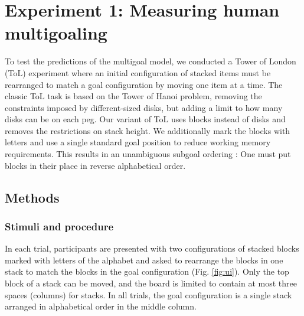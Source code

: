 \documentclass[10pt,letterpaper]{article}
\newcommand{\todo}[1]{\textcolor{red}{\textsc{[TODO: #1]}}}
\begin{document}
\section{Experiment 1: Measuring human multigoaling}

To test the predictions of the multigoal model, we conducted a Tower of London (ToL) experiment \citep{Shallice1982} where an initial configuration of stacked items must be rearranged to match a goal configuration by moving one item at a time. The classic ToL task is based on the Tower of Hanoi problem, removing the constraints imposed by different-sized disks, but adding a limit to how many disks can be on each peg. Our variant of ToL uses blocks instead of disks and removes the restrictions on stack height. We additionally mark the blocks with letters and use a single standard goal position to reduce working memory requirements. This results in an unambiguous subgoal ordering \citep{Kaller2011}: One must put blocks in their place in reverse alphabetical order.





\subsection{Methods}
\subsubsection{Stimuli and procedure}

In each trial, participants are presented with two configurations of stacked blocks marked with letters of the alphabet and asked to rearrange the blocks in one stack to match the blocks in the goal configuration (Fig. \ref{fig:ui}). Only the top block of a stack can be moved, and the board is limited to contain at most three spaces (columns) for stacks. In all trials, the goal configuration is a single stack arranged in alphabetical order in the middle column.
\end{document}
